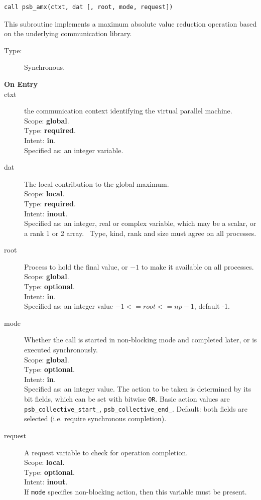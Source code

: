 \begin{verbatim}
call psb_amx(ctxt, dat [, root, mode, request])
\end{verbatim}

This subroutine implements a maximum absolute value reduction
operation based on the underlying communication library. 
\begin{description}
\item[Type:] Synchronous.
\item[\bf  On Entry ]
\item[ctxt] the communication context identifying the virtual
  parallel machine.\\
Scope: {\bf global}.\\
Type: {\bf required}.\\
Intent: {\bf in}.\\
Specified as: an integer variable.
\item[dat] The local contribution to the global maximum.\\
Scope: {\bf local}.\\
Type: {\bf required}.\\
Intent: {\bf inout}.\\
Specified as: an integer, real or complex variable, which may be a
scalar, or a rank 1 or 2 array. \
Type, kind, rank and size must agree on all processes.
\item[root] Process to hold the final value, or $-1$ to make it available
  on all processes.\\
Scope: {\bf global}.\\
Type: {\bf optional}.\\
Intent: {\bf in}.\\
Specified as: an integer value $-1<= root <= np-1$, default -1. \\
\item[mode] Whether the call is started in non-blocking mode and completed
  later, or is executed synchronously.\\
Scope: {\bf global}.\\
Type: {\bf optional}.\\
Intent: {\bf in}.\\
Specified as: an integer value. The action to be taken is determined
by its bit fields, which can be set with bitwise \verb|OR|. Basic
action values are \verb|psb_collective_start_|, \verb|psb_collective_end_|.
Default:  both fields are selected (i.e. require synchronous completion).\\
\item[request] A request variable to check for operation completion.\\
Scope: {\bf local}.\\
Type: {\bf optional}.\\
Intent: {\bf inout}.\\
If \verb|mode| specifies non-blocking action, then this
variable must be present.
\end{description}


